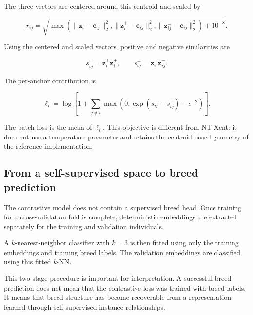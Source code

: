 The three vectors are centered around this centroid and scaled by

\begin{equation}
    r_{ij}
    =
    \sqrt{
        \max
        \left(
            \|\mathbf{z}_i-\mathbf{c}_{ij}\|_2^2,
            \|\mathbf{z}_i^{+}-\mathbf{c}_{ij}\|_2^2,
            \|\mathbf{z}_{ij}^{-}-\mathbf{c}_{ij}\|_2^2
        \right)
        +
        10^{-8}
    }.
\end{equation}

Using the centered and scaled vectors, positive and negative
similarities are

\begin{equation}
    s_{ij}^{+}
    =
    \tilde{\mathbf{z}}_i^\top
    \tilde{\mathbf{z}}_i^{+},
    \qquad
    s_{ij}^{-}
    =
    \tilde{\mathbf{z}}_i^\top
    \tilde{\mathbf{z}}_{ij}^{-}.
\end{equation}

The per-anchor contribution is

\begin{equation}
    \ell_i
    =
    \log
    \left[
        1
        +
        \sum_{j\neq i}
        \max
        \left(
            0,
            \exp(s_{ij}^{-}-s_{ij}^{+})
            -
            e^{-2}
        \right)
    \right].
\end{equation}

The batch loss is the mean of $\ell_i$. This objective is different
from NT-Xent: it does not use a temperature parameter and retains the
centroid-based geometry of the reference implementation.

\subsection{From a self-supervised space to breed prediction}

The contrastive model does not contain a supervised breed head. Once
training for a cross-validation fold is complete, deterministic embeddings
are extracted separately for the training and validation individuals.

A $k$-nearest-neighbor classifier with $k=3$ is then fitted using only
the training embeddings and training breed labels. The validation
embeddings are classified using this fitted $k$-NN.

This two-stage procedure is important for interpretation. A successful
breed prediction does not mean that the contrastive loss was trained
with breed labels. It means that breed structure has become
recoverable from a representation learned through self-supervised
instance relationships.

